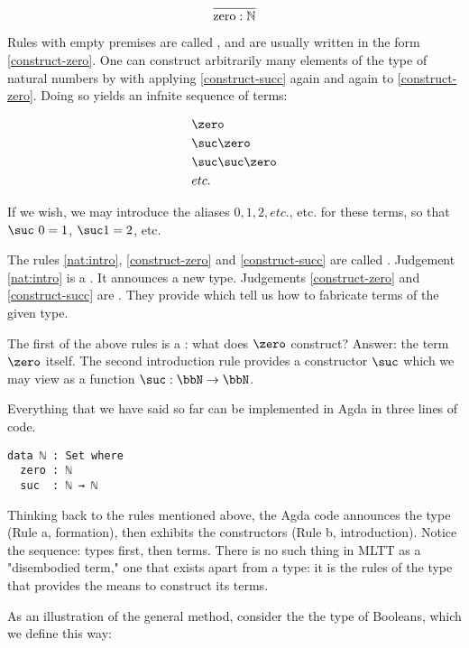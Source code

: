 \begin{equation}
\label{construct-zero-b}
\frac{}{\text{zero}\space : \mathbb{N}}
\end{equation} 

Rules with empty premises are called , and are usually written in the form \eqref{construct-zero}.  One can construct arbitrarily many elements of the type of natural numbers by with applying \eqref{construct-succ} again and again to \eqref{construct-zero}.  Doing so yields an infnite sequence of terms:

\begin{align}
& \zero \\
& \suc \zero \\
& \suc \suc \zero \\
& etc.
\end{align}

If we wish, we may introduce the aliases $0, 1, 2, etc.$, etc. for these terms, so that $\suc\ 0 = 1$, $\suc 1 = 2$, etc.

The rules \eqref{nat:intro}, \eqref{construct-zero} and \eqref{construct-succ} are called . Judgement \eqref{nat:intro} is a .  It announces a new type. Judgements \eqref{construct-zero} and \eqref{construct-succ} are .  They provide  which tell us how to fabricate terms of the given type.  

The first of the above rules is a : what does $\zero$ construct?  Answer: the term $\zero$ itself. The second introduction rule provides a constructor $\suc$ which we may view as a function $\suc : \bbN \to \bbN$. 

Everything that we have said so far can be implemented in Agda in three lines of code.

\begin{verbatim}
data ℕ : Set where
  zero : ℕ
  suc  : ℕ → ℕ
\end{verbatim}

Thinking back to the rules mentioned above, the Agda code announces the type (Rule a, formation), then exhibits the constructors (Rule b, introduction).    Notice the sequence: types first, then terms.  There is no such thing in MLTT as a "disembodied term," one that exists apart from a type: it is the rules of the type that provides the means to construct its terms. 

As an illustration of the general method, consider the the type of Booleans, which we define this way:

